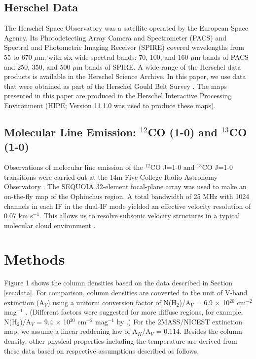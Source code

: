 \documentclass[11pt,a4paper]{emulateapj}
\begin{document}
\subsection{Herschel Data}
The Herschel Space Observatory was a satellite operated by the European Space Agency. Its Photodetecting Array Camera and Spectrometer (PACS) and Spectral and Photometric Imaging Receiver (SPIRE) covered wavelengths from 55 to 670 $\mu$m, with six wide spectral bands: 70, 100, and 160 $\mu$m bands of PACS and 250, 350, and 500 $\mu$m bands of SPIRE. A wide range of the Herschel data products is available in the Herschel Science Archive. In this paper, we use data that were obtained as part of the Herschel Gould Belt Survey \citep{Andre_2010}. The maps presented in this paper are produced in the Herschel Interactive Processing Environment (HIPE; Version 11.1.0 was used to produce these maps).

\subsection{Molecular Line Emission: $^{12}$CO (1-0) and $^{13}$CO (1-0)}
Observations of molecular line emission of the $^{12}$CO J=1-0 and $^{13}$CO J=1-0 transitions were carried out at the 14m Five College Radio Astronomy Observatory \citep[FCRAO;]{Ridge_2006}. The SEQUOIA 32-element focal-plane array was used to make an on-the-fly map of the Ophiuchus region. A total bandwidth of 25 MHz with 1024 channels in each IF in the dual-IF mode yielded an effective velocity resolution of 0.07 km s$^{-1}$. This allows us to resolve subsonic velocity structures in a typical molecular cloud environment \citep[with a temperature of 15 K and an average molecular weight of 2.33 m$_H$;]{Carey_1998,Pillai_2006}.

\section{Methods}
\label{sec:methods}
Figure 1 shows the column densities based on the data described in Section \ref{sec:data}. For comparison, column densities are converted to the unit of V-band extinction (A$_V$) using a uniform conversion factor of N(H$_2$)/A$_V$ = 6.9 $\times$ 10$^{20}$ cm$^{-2}$ mag$^{-1}$ \citep{Draine_2003,Evans_2009}. (Different factors were suggested for more diffuse regions, for example, N(H$_2$)/A$_V$ = 9.4 $\times$ 10$^{20}$ cm$^{-2}$ mag$^{-1}$ by \citet{Bohlin_1978}.) For the 2MASS/NICEST extinction map, we assume a linear reddening law of A$_K$/A$_V$ = 0.114. Besides the column density, other physical properties including the temperature are derived from these data based on respective assumptions described as follows.
\end{document}

